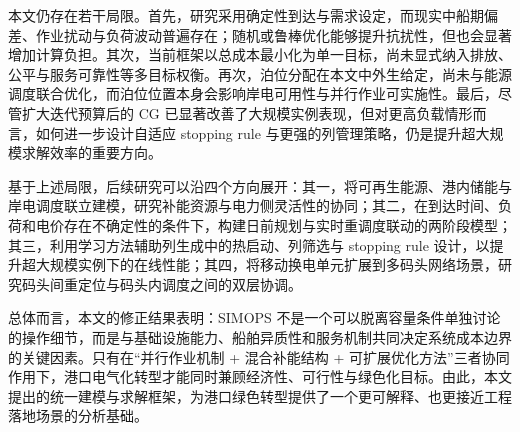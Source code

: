 \documentclass[UTF8, a4paper, 12pt]{ctexart}
\begin{document}
本文仍存在若干局限。首先，研究采用确定性到达与需求设定，而现实中船期偏差、作业扰动与负荷波动普遍存在\cite{UNCTAD2021}；随机或鲁棒优化能够提升抗扰性，但也会显著增加计算负担\cite{Rodrigues2022}。其次，当前框架以总成本最小化为单一目标，尚未显式纳入排放、公平与服务可靠性等多目标权衡。再次，泊位分配在本文中外生给定，尚未与能源调度联合优化，而泊位位置本身会影响岸电可用性与并行作业可实施性\cite{Dai2020}。最后，尽管扩大迭代预算后的 CG 已显著改善了大规模实例表现，但对更高负载情形而言，如何进一步设计自适应 stopping rule 与更强的列管理策略，仍是提升超大规模求解效率的重要方向。

基于上述局限，后续研究可以沿四个方向展开：其一，将可再生能源、港内储能与岸电调度联立建模，研究补能资源与电力侧灵活性的协同\cite{Li2022_BSS}；其二，在到达时间、负荷和电价存在不确定性的条件下，构建日前规划与实时重调度联动的两阶段模型；其三，利用学习方法辅助列生成中的热启动、列筛选与 stopping rule 设计，以提升超大规模实例下的在线性能\cite{Bengio2021}；其四，将移动换电单元扩展到多码头网络场景，研究码头间重定位与码头内调度之间的双层协调。

总体而言，本文的修正结果表明：SIMOPS 不是一个可以脱离容量条件单独讨论的操作细节，而是与基础设施能力、船舶异质性和服务机制共同决定系统成本边界的关键因素。只有在“并行作业机制 + 混合补能结构 + 可扩展优化方法”三者协同作用下，港口电气化转型才能同时兼顾经济性、可行性与绿色化目标。由此，本文提出的统一建模与求解框架，为港口绿色转型提供了一个更可解释、也更接近工程落地场景的分析基础。

\FloatBarrier


\end{document}
